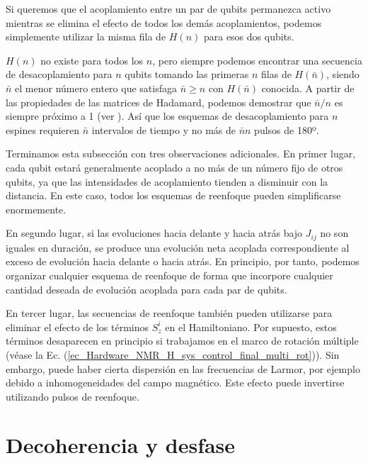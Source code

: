 Si queremos que el acoplamiento entre un par de qubits permanezca activo mientras se elimina el efecto de todos los demás acoplamientos, podemos simplemente utilizar la misma fila de $H(n)$ para esos dos qubits. 

$H(n)$ no existe para todos los $n$, pero siempre podemos encontrar una secuencia de desacoplamiento para $n$ qubits tomando las primeras $n$ filas de $H(\bar{n})$, siendo $\bar{n}$ el menor número entero que satisfaga $\bar{n} \geq n $ con $H(\bar{n})$ conocida. A partir de las propiedades de las matrices de Hadamard, podemos demostrar que $\bar{n}/n$ es siempre próximo a 1 (ver \cite{bib_Hardware_NMR_reenfoque_Hadammard_1}). Así que los esquemas de desacoplamiento para $n$ espines requieren $\bar{n}$ intervalos de tiempo y no más de $\bar{n}n$ pulsos de 180º.

Terminamos esta subsección con tres observaciones adicionales.
En primer lugar, cada qubit estará generalmente acoplado a no más de un número fijo de otros qubits, ya que las intensidades de acoplamiento tienden a disminuir con la distancia. En este caso, todos los esquemas de reenfoque pueden simplificarse enormemente. 

En segundo lugar, si las evoluciones hacia delante y hacia atrás bajo
$J_{ij}$ no son iguales en duración, se produce una evolución neta acoplada correspondiente al exceso de evolución hacia delante o hacia atrás. En principio, por tanto, podemos organizar cualquier esquema de reenfoque de forma que incorpore cualquier cantidad deseada de evolución acoplada para cada par de qubits.

En tercer lugar, las secuencias de reenfoque también pueden utilizarse para eliminar el efecto de los términos $S_{z}^i$ en el Hamiltoniano. Por supuesto, estos términos desaparecen en principio si trabajamos en el marco de rotación múltiple (véase la Ec. (\ref{ec_Hardware_NMR_H_sys_control_final_multi_rot})). Sin embargo, puede haber cierta dispersión en las frecuencias de Larmor, por ejemplo debido a inhomogeneidades del campo magnético. Este efecto puede invertirse utilizando pulsos de reenfoque.













\chapter{Decoherencia y desfase}

